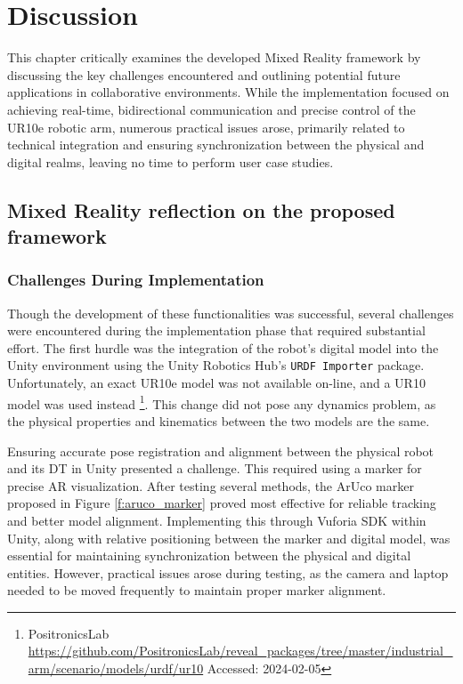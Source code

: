 \chapter{Discussion}

\begin{introduction}
    This chapter critically examines the developed Mixed Reality framework by discussing the key challenges encountered and outlining potential future applications in collaborative environments. While the implementation focused on achieving real-time, bidirectional communication and precise control of the UR10e robotic arm, numerous practical issues arose, primarily related to technical integration and ensuring synchronization between the physical and digital realms, leaving no time to perform user case studies.
\end{introduction}

\section{Mixed Reality reflection on the proposed framework}

\subsection{Challenges During Implementation}
Though the development of these functionalities was successful, several challenges were encountered during the implementation phase that required substantial effort. The first hurdle was the integration of the robot’s digital model into the Unity environment using the Unity Robotics Hub's \texttt{URDF Importer} package. Unfortunately, an exact UR10e model was not available on-line, and a UR10 model was used instead \footnote{PositronicsLab \url{https://github.com/PositronicsLab/reveal_packages/tree/master/industrial_arm/scenario/models/urdf/ur10} Accessed: 2024-02-05}. This change did not pose any dynamics problem, as the physical properties and kinematics between the two models are the same.

Ensuring accurate pose registration and alignment between the physical robot and its \ac{DT} in Unity presented a challenge. This required using a marker for precise \ac{AR} visualization. After testing several methods, the ArUco marker proposed in Figure \ref{f:aruco_marker} proved most effective for reliable tracking and better model alignment. Implementing this through Vuforia \ac{SDK} within Unity, along with relative positioning between the marker and digital model, was essential for maintaining synchronization between the physical and digital entities. However, practical issues arose during testing, as the camera and laptop needed to be moved frequently to maintain proper marker alignment.

